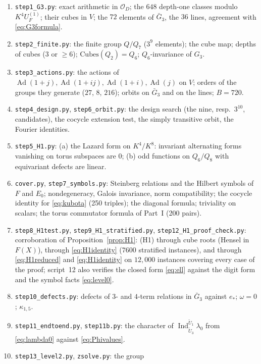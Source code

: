 \documentclass[11pt]{article}
\newcommand{\Ind}{\operatorname{Ind}}
\newcommand{\Ad}{\operatorname{Ad}}
\newcommand{\tU}{\widetilde U}
\newcommand{\Ocal}{\mathcal O}
\newcommand{\Cubes}{\mathrm{Cubes}}
\theoremstyle{plain}
\theoremstyle{definition}
\begin{document}
\begin{enumerate}[label=\arabic*.]
\item \texttt{step1\_G3.py}: exact arithmetic in $\Ocal_D$; the $648$
depth-one classes modulo $K^4U_F^{(1)}$; their cubes in $V$; the $72$
elements of $\bar G_3$, the $36$ lines, agreement with \eqref{eq:G3formula}.
\item \texttt{step2\_finite.py}: the finite group $Q/Q_7$ ($3^9$
elements); the cube map; depths of cubes ($3$ or $\ge6$);
$\Cubes(Q_2)=Q_6$; $Q_6$-invariance of $G_3$.
\item \texttt{step3\_actions.py}: the actions of $\Ad(1+j),\Ad(1+ij),\Ad(1+i),\Ad(j)$
on $V$; orders of the groups they generate ($27$, $8$, $216$); orbits on
$\bar G_3$ and on the lines; $B=720$.
\item \texttt{step4\_design.py}, \texttt{step6\_orbit.py}: the design
search (the nine, resp.\ $3^{10}$, candidates), the cocycle extension
test, the simply transitive orbit, the Fourier identities.
\item \texttt{step5\_H1.py}: (a) the Lazard form on $K^4/K^8$:
invariant alternating forms vanishing on torus subspaces are $0$;
(b) odd functions on $Q_6/Q_8$ with equivariant defects are linear.
\item \texttt{cover.py}, \texttt{step7\_symbols.py}: Steinberg
relations and the Hilbert symbols of $F$ and $E_0$; nondegeneracy,
Galois invariance, norm compatibility; the cocycle identity for
\eqref{eq:kubota} (250 triples); the diagonal formula; triviality on
scalars; the torus commutator formula of Part~I (200 pairs).
\item \texttt{step8\_H1test.py}, \texttt{step9\_H1\_stratified.py},
\texttt{step12\_H1\_proof\_check.py}: corroboration of
Proposition~\ref{prop:H1}: (H1) through cube roots (Hensel in $F(X)$),
through \eqref{eq:H1identity} ($7600$ stratified instances), and
through \eqref{eq:H1reduced} and \eqref{eq:H1identity} on $12{,}000$
instances covering every case of the proof; script~12 also verifies the
closed form \eqref{eq:ell} against the digit form and the symbol facts
\eqref{eq:level0}.
\item \texttt{step10\_defects.py}: defects of $3$- and $4$-term
relations in $\bar G_3$ against $e_*$; $\omega=0$; $\kappa_{1,5}$.
\item \texttt{step11\_endtoend.py}, \texttt{step11b.py}: the character
of $\Ind_{\tU_3}^{\tU_1}\lambda_0$ from \eqref{eq:lambda0} against
\eqref{eq:Phivalues}.
\item \texttt{step13\_level2.py}, \texttt{zsolve.py}: the group

\end{enumerate}
\end{document}
